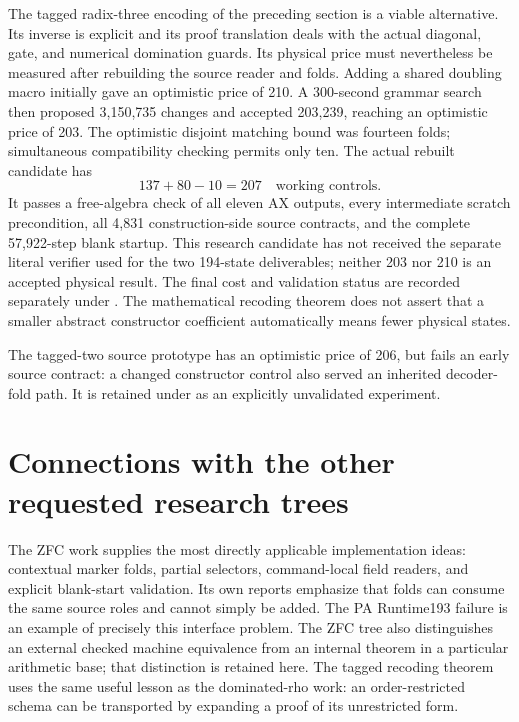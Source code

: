 \documentclass[11pt,letterpaper]{article}
\newcommand{\file}[1]{\path{#1}}
\begin{document}
The tagged radix-three encoding of the preceding section is a viable
alternative. Its inverse is explicit and its proof translation deals
with the actual diagonal, gate, and numerical domination guards. Its
physical price must nevertheless be measured after rebuilding the
source reader and folds. Adding a shared doubling macro initially gave
an optimistic price of 210. A 300-second grammar search then proposed
3,150,735 changes and accepted 203,239, reaching an optimistic price of
203. The optimistic disjoint matching bound was fourteen folds;
simultaneous compatibility checking permits only ten. The actual rebuilt
candidate has
\[
 137+80-10=207\quad\text{working controls}.
\]
It passes a free-algebra check of all eleven AX outputs, every intermediate
scratch precondition, all 4,831 construction-side source contracts, and
the complete 57,922-step blank startup. This research candidate has not
received the separate literal verifier used for the two 194-state
deliverables; neither 203 nor 210 is an accepted physical result.
The final cost and validation status are recorded separately under
\file{research/tagged3_pricing/}. The mathematical recoding theorem does
not assert that a smaller abstract constructor coefficient automatically
means fewer physical states.

The tagged-two source prototype has an optimistic price of 206, but
fails an early source contract: a changed constructor control also
served an inherited decoder-fold path. It is retained under
\file{research/tagged2_pricing/} as an explicitly unvalidated experiment.

\section{Connections with the other requested research trees}

The ZFC work \cite{zfc} supplies the most directly applicable implementation ideas:
contextual marker folds, partial selectors, command-local field readers,
and explicit blank-start validation. Its own reports emphasize that
folds can consume the same source roles and cannot simply be added.
The PA Runtime193 failure is an example of precisely this interface
problem. The ZFC tree also distinguishes an external checked machine
equivalence from an internal theorem in a particular arithmetic base;
that distinction is retained here. The tagged recoding theorem uses the
same useful lesson as the dominated-rho work: an order-restricted schema
can be transported by expanding a proof of its unrestricted form.
\end{document}
